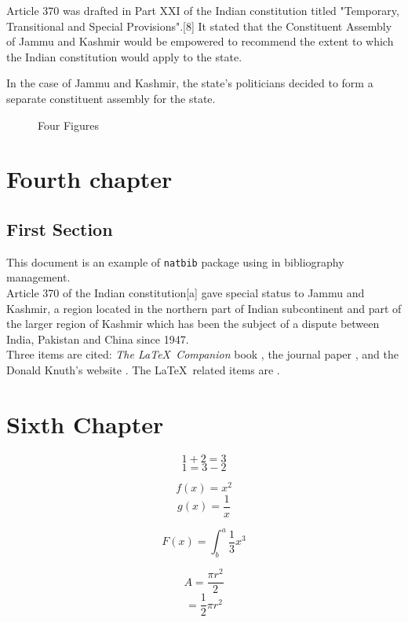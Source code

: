 \documentclass{book}
\begin{document}
\begin{multicols}{2}


Article 370 was drafted in Part XXI of the Indian constitution titled "Temporary, Transitional and Special Provisions".[8] It stated that the Constituent Assembly of Jammu and Kashmir would be empowered to recommend the extent to which the Indian constitution would apply to the state. 

In the case of Jammu and Kashmir, the state's politicians decided to form a separate constituent assembly for the state. 

\end{multicols}

\listoffigures

\begin{figure}
    \caption{Four Figures}
    \label{fig:my_label}
\end{figure}


\chapter{Fourth chapter}
\section{First Section}

This document is an example of \texttt{natbib} package using in bibliography management.\\
Article 370 of the Indian constitution[a] gave special status to Jammu and Kashmir, a region located in the northern part of Indian subcontinent and part of the larger region of Kashmir which has been the subject of a dispute between India, Pakistan and China since 1947.\\
Three items are cited: \textit{The \LaTeX\ Companion} book \cite{latexcompanion}, the  journal paper \citet{einstein}, and the 
Donald Knuth's website \cite{latexcompanion}. The \LaTeX\ related items are
\cite{latexcompanion,knuthwebsite}. 





\chapter{Sixth Chapter}
\[ 1 + 2 = 3\]
\[ 1 = 3 - 2\]

\[ f(x) = x^2\]
\[ g(x) = \frac{1}{x} \]

\[ F(x) = \int_{b}^{a} \frac{1}{3} x^3 \]

\[ A = \frac{\pi r^2}{2}  \]
\[  = \frac{1}{2} \pi r^2  \]
\end{document}
